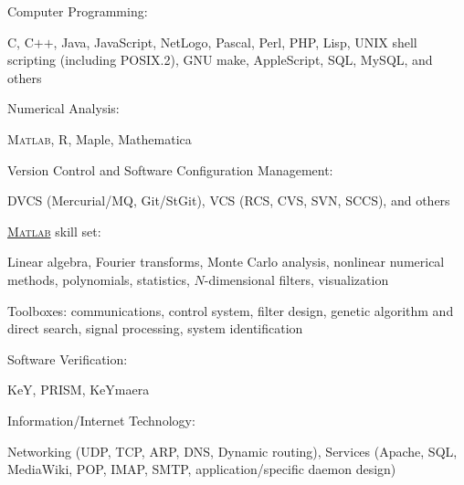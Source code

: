 \documentclass[10pt]{article}           %
\newcommand{\halfblankline}{\quad\vspace{-0.5\baselineskip}\pagebreak[3]}
\providecommand\Matlab{\textsc{Matlab}}
\begin{document}
\halfblankline

Computer Programming:
%
\begin{innerlist}
    \item C, C$+$$+$, Java, JavaScript, NetLogo, Pascal, Perl, PHP,
        Lisp, UNIX shell scripting (including POSIX.2), GNU make,
        AppleScript, SQL, MySQL, and others
\end{innerlist}

\halfblankline

Numerical Analysis:
%
\begin{innerlist}
    \item \Matlab, R, Maple, Mathematica
\end{innerlist}

\halfblankline

Version Control and Software Configuration Management:
%
\begin{innerlist}
    \item DVCS (Mercurial/MQ, Git/StGit), VCS (RCS, CVS, SVN, SCCS), and
        others
\end{innerlist}

\halfblankline

\href{http://www.mathworks.com/products/matlab/}{\Matlab} skill set:
%
\begin{innerlist}
    \item Linear algebra, Fourier transforms, Monte Carlo analysis,
        nonlinear numerical methods, polynomials, statistics,
        $N$-dimensional filters, visualization

    \item Toolboxes: communications, control system, filter design,
        genetic algorithm and direct search, signal processing, system
        identification
\end{innerlist}

\halfblankline

Software Verification:
%
\begin{innerlist}
    \item KeY, PRISM, KeYmaera
\end{innerlist}

\halfblankline

Information/Internet Technology:
%
\begin{innerlist}
    \item Networking (UDP, TCP, ARP, DNS, Dynamic
        routing), Services (Apache, SQL, MediaWiki, POP, IMAP, SMTP,
        application\-/specific daemon design)
\end{innerlist}
\end{document}

